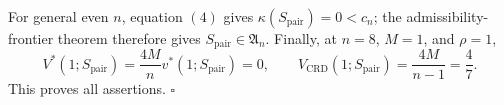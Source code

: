 For general even \(n\), equation \((4)\) gives \(\kappa(S_{\mathrm{pair}})=0<c_n\); the admissibility-frontier theorem therefore gives \(S_{\mathrm{pair}}\in\mathfrak A_n\).  Finally, at \(n=8\), \(M=1\), and \(\rho=1\),
\[
V^*(1;S_{\mathrm{pair}})
=\frac{4M}{n}v^*(1;S_{\mathrm{pair}})=0,
\qquad
V_{\mathrm{CRD}}(1;S_{\mathrm{pair}})
=\frac{4M}{n-1}=\frac47.
\tag{8}
\]
This proves all assertions.  \(\square\)